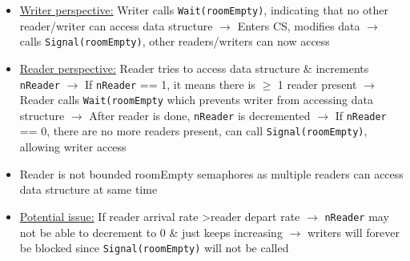 \documentclass[landscape]{article}
\begin{document}
\begin{multicols*}{6}
\begin{itemize}
\begin{itemize}
        \item \underline{Writer perspective:} Writer calls \verb|Wait(roomEmpty)|, indicating that no other reader/writer can access data structure $\rightarrow$ Enters CS, modifies data $\rightarrow$ calls \verb|Signal(roomEmpty)|, other readers/writers can now access
        \item \underline{Reader perspective:} Reader tries to access data structure \& increments \verb|nReader| $\rightarrow$ If \verb|nReader| == 1, it means there is $\geq$ 1 reader present $\rightarrow$ Reader calls \verb|Wait(roomEmpty| which prevents writer from accessing data structure $\rightarrow$ After reader is done, \verb|nReader| is decremented $\rightarrow$ If \verb|nReader| == 0, there are no more readers present, can call \verb|Signal(roomEmpty)|, allowing writer access
        \item Reader is not bounded roomEmpty semaphores as multiple readers can access data structure at same time
        \item \underline{Potential issue:} If reader arrival rate \textgreater reader depart rate $\rightarrow$ \verb|nReader| may not be able to decrement to 0 \& just keeps increasing $\rightarrow$ writers will forever be blocked since \verb|Signal(roomEmpty)| will not be called
      \end{itemize}
    \end{itemize}


\end{multicols*}
\end{document}
